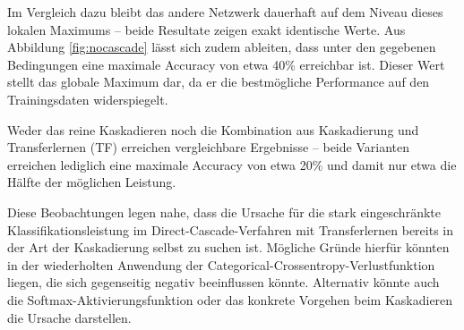 Im Vergleich dazu bleibt das andere Netzwerk dauerhaft auf dem Niveau dieses lokalen Maximums – beide Resultate zeigen exakt identische Werte. 
Aus Abbildung \ref{fig:nocascade} lässt sich zudem ableiten, dass unter den gegebenen Bedingungen eine maximale Accuracy von etwa 40\% erreichbar 
ist. Dieser Wert stellt das globale Maximum dar, da er die bestmögliche Performance auf den Trainingsdaten widerspiegelt.

Weder das reine Kaskadieren noch die Kombination aus Kaskadierung und Transferlernen (TF) erreichen vergleichbare Ergebnisse – beide Varianten 
erreichen lediglich eine maximale Accuracy von etwa 20\% und damit nur etwa die Hälfte der möglichen Leistung.

Diese Beobachtungen legen nahe, dass die Ursache für die stark eingeschränkte Klassifikationsleistung im Direct-Cascade-Verfahren mit 
Transferlernen bereits in der Art der Kaskadierung selbst zu suchen ist. Mögliche Gründe hierfür könnten in der wiederholten Anwendung der 
Categorical-Crossentropy-Verlustfunktion liegen, die sich gegenseitig negativ beeinflussen könnte. Alternativ könnte auch die 
Softmax-Aktivierungsfunktion oder das konkrete Vorgehen beim Kaskadieren die Ursache darstellen.
